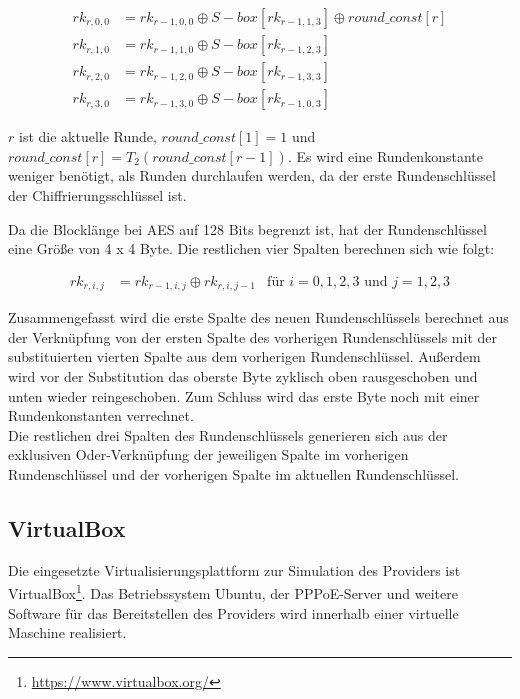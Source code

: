     \begin{equation*}
     \begin{aligned}
     rk_{r,0,0} &= rk_{r-1,0,0} \oplus S-box[rk_{r-1,1,3}] \oplus round\_const[r] \\
     rk_{r,1,0} &= rk_{r-1,1,0} \oplus S-box[rk_{r-1,2,3}] \\
     rk_{r,2,0} &= rk_{r-1,2,0} \oplus S-box[rk_{r-1,3,3}] \\
     rk_{r,3,0} &= rk_{r-1,3,0} \oplus S-box[rk_{r-1,0,3}]
     \end{aligned}
    \end{equation*}
    
   $r$ ist die aktuelle Runde, $round\_const[1] = 1$ und $round\_const[r] = T_2(round\_const[r-1])$. Es wird eine
   Rundenkonstante weniger benötigt, als Runden durchlaufen werden, da der erste Rundenschlüssel der 
   Chiffrierungs\-schlüssel ist.
   
   Da die Blocklänge bei AES auf 128 Bits begrenzt ist, hat der Rundenschlüssel eine Größe von 4 x 4 Byte. Die
   restlichen vier Spalten berechnen sich wie folgt:
   
    \begin{equation*}
     \begin{aligned}
      rk_{r,i,j} &= rk_{r-1,i,j} \oplus rk_{r,i,j-1} &\text{für $i = 0, 1, 2, 3$ und $j = 1, 2, 3$}
     \end{aligned}
    \end{equation*}
    
   Zusammengefasst wird die erste Spalte des neuen Rundenschlüssels berechnet aus der Verknüpfung
   von der ersten Spalte des vorherigen Rundenschlüssels mit der substituierten vierten Spalte aus dem vorherigen
   Rundenschlüssel. Außerdem wird vor der Substitution das oberste Byte zyklisch oben rausgeschoben und unten
   wieder reingeschoben. Zum Schluss wird das erste Byte noch mit einer Rundenkonstanten verrechnet. \\
   Die restlichen drei Spalten des Rundenschlüssels generieren sich aus der exklusiven Oder-Verknüpfung der
   jeweiligen Spalte im vorherigen Rundenschlüssel und der vorherigen Spalte im aktuellen Rundenschlüssel.

\subsection{VirtualBox}
Die eingesetzte Virtualisierungsplattform zur Simulation des Providers ist VirtualBox\footnote{\url{https://www.virtualbox.org/}}. Das Betriebssystem Ubuntu, der PPPoE-Server und weitere Software für
das Bereitstellen des Providers wird innerhalb einer virtuelle Maschine realisiert.

